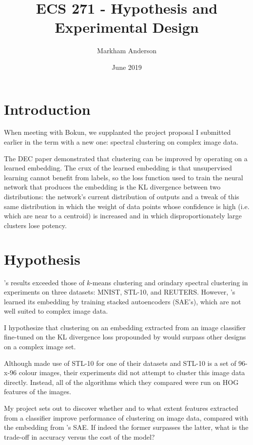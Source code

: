 \documentclass{article}
\title{ECS 271 - Hypothesis and Experimental Design}
\author{Markham Anderson}
\date{June 2019}
\begin{document}
\maketitle

\section{Introduction}

When meeting with Bokun, we supplanted the project proposal I submitted earlier in the term with a new one: spectral clustering on complex image data.

The DEC paper \cite{xie2016unsupervised} demonstrated that clustering can be improved by operating on a learned embedding. The crux of the learned embedding is that unsupervised learning cannot benefit from labels, so the loss function used to train the neural network that produces the embedding is the KL divergence between two distributions: the network's current distribution of outputs and a tweak of this same distribution in which the weight of data points whose confidence is high (i.e. which are near to a centroid) is increased and in which disproportionately large clusters lose potency.

\section{Hypothesis}

\cite{xie2016unsupervised}'s results exceeded those of $k$-means clustering and orindary spectral clustering in experiments on three datasets: MNIST, STL-10, and REUTERS. However, \cite{xie2016unsupervised}'s learned its embedding by training stacked autoencoders (SAE's), which are not well suited to complex image data.

I hypothesize that clustering on an embedding extracted from an image classifier fine-tuned on the KL divergence loss propounded by \cite{xie2016unsupervised} would surpass other designs on a complex image set.

Although \cite{xie2016unsupervised} made use of STL-10 for one of their datasets and STL-10 is a set of 96-x-96 colour images, their experiments did not attempt to cluster this image data directly. Instead, all of the algorithms which they compared were run on HOG features of the images.

My project sets out to discover whether and to what extent features extracted from a classifier improve performance of clustering on image data, compared with the embedding from \cite{xie2016unsupervised}'s SAE. If indeed the former surpasses the latter, what is the trade-off in accuracy versus the cost of the model?
\end{document}
